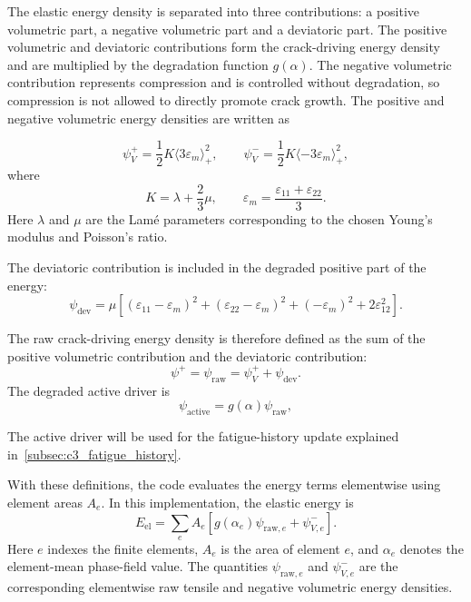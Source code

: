 The elastic energy density is separated into three contributions: a positive volumetric part, a negative volumetric part and a deviatoric part. The positive volumetric and deviatoric contributions form the crack-driving energy density and are multiplied by the degradation function \(g(\alpha)\). The negative volumetric contribution represents compression and is controlled without degradation, so compression is not allowed to directly promote crack growth. The positive and negative volumetric energy densities are written as

\begin{equation}
    \psi_V^+
    =
    \frac{1}{2}K\langle 3\varepsilon_m\rangle_+^2,
    \qquad
    \psi_V^-
    =
    \frac{1}{2}K\langle -3\varepsilon_m\rangle_+^2,
    \label{eq:c3_volumetric_split}
\end{equation}
where
\begin{equation}
    K=\lambda+\frac{2}{3}\mu,
    \qquad
    \varepsilon_m=\frac{\varepsilon_{11}+\varepsilon_{22}}{3}.
    \label{eq:c3_bulk_mean_strain}
\end{equation}
Here \(\lambda\) and \(\mu\) are the Lamé parameters corresponding to the chosen Young's modulus and Poisson's ratio.

The deviatoric contribution is included in the degraded positive part of the energy:
\begin{equation}
    \psi_{\mathrm{dev}}
    =
    \mu
    \left[
    (\varepsilon_{11}-\varepsilon_m)^2
    +
    (\varepsilon_{22}-\varepsilon_m)^2
    +
    (-\varepsilon_m)^2
    +
    2\varepsilon_{12}^2
    \right].
    \label{eq:c3_deviatoric_energy}
\end{equation}

The raw crack-driving energy density is therefore defined as the sum of the positive volumetric contribution and the deviatoric contribution:
\begin{equation}
    \psi^+
    =
    \psi_{\mathrm{raw}}
    =
    \psi_V^+ + \psi_{\mathrm{dev}}.
    \label{eq:c3_raw_driver}
\end{equation}
The degraded active driver is
\begin{equation}
    \psi_{\mathrm{active}}
    =
    g(\alpha)\psi_{\mathrm{raw}},
    \label{eq:c3_active_driver}
\end{equation}

The active driver will be used for the fatigue-history update explained in~\ref{subsec:c3_fatigue_history}.

With these definitions, the code evaluates the energy terms elementwise using element areas $A_e$. In this implementation, the elastic energy is
\begin{equation}
    E_{\mathrm{el}}
    =
    \sum_e
    A_e
    \left[
    g(\alpha_e)\psi_{\mathrm{raw},e}
    +
    \psi_{V,e}^-
    \right].
    \label{eq:c3_elastic_energy}
\end{equation}
Here $e$ indexes the finite elements, $A_e$ is the area of element $e$, and $\alpha_e$ denotes the element-mean phase-field value. The quantities $\psi_{\mathrm{raw},e}$ and $\psi_{V,e}^-$ are the corresponding elementwise raw tensile and negative volumetric energy densities.


